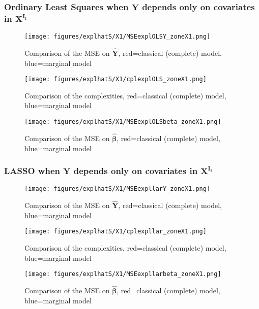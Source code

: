 \documentclass[12pt,a4paper]{report}
\begin{document}
 	
 

\newpage
\subsubsection{Ordinary Least Squares when $\boldsymbol{Y}$ depends only on covariates in $\boldsymbol{X^{I_f}}$}

	\begin{figure}[h!]
	\centering
		  \texttt{[image: figures/explhatS/X1/MSEexplOLSY\_zoneX1.png]}
		\caption{Comparison of the MSE on $\hat{\boldsymbol{Y}}$, red=classical (complete) model, blue=marginal model}\label{MSEexplOLSY_zoneX1}
	\end{figure}
	\begin{figure}[h!]
	\centering
		  \texttt{[image: figures/explhatS/X1/cplexplOLS\_zoneX1.png]}
		\caption{Comparison of the complexities, red=classical (complete) model, blue=marginal model}\label{cplexplOLS_zoneX1}
	\end{figure}
	\begin{figure}[h!]
	\centering
		  \texttt{[image: figures/explhatS/X1/MSEexplOLSbeta\_zoneX1.png]}
		\caption{Comparison of the MSE on $\hat{\boldsymbol{\beta}}$, red=classical (complete) model, blue=marginal model}\label{MSEexplOLSbeta_zoneX1}
	\end{figure}
	\FloatBarrier
\newpage
\subsubsection{LASSO when $\boldsymbol{Y}$ depends only on covariates in $\boldsymbol{X^{I_f}}$}

	\begin{figure}[h!]
	\centering
		  \texttt{[image: figures/explhatS/X1/MSEexpllarY\_zoneX1.png]}
		\caption{Comparison of the MSE on $\hat{\boldsymbol{Y}}$, red=classical (complete) model, blue=marginal model}\label{MSEexpllarY_zoneX1}
	\end{figure}
	\begin{figure}[h!]
	\centering
		  \texttt{[image: figures/explhatS/X1/cplexpllar\_zoneX1.png]}
		\caption{Comparison of the complexities, red=classical (complete) model, blue=marginal model}\label{cplexpllar_zoneX1}
	\end{figure}
	\begin{figure}[h!]
	\centering
		  \texttt{[image: figures/explhatS/X1/MSEexpllarbeta\_zoneX1.png]}
		\caption{Comparison of the MSE on $\hat{\boldsymbol{\beta}}$, red=classical (complete) model, blue=marginal model}\label{MSEexpllarbeta_zoneX1}
	\end{figure}
	\FloatBarrier
\newpage
\end{document}
